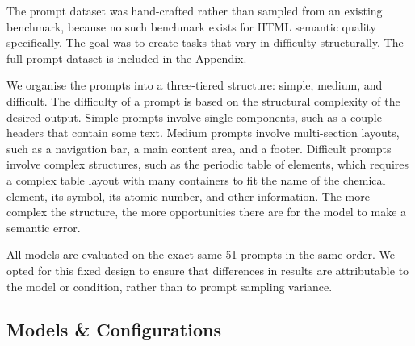 The prompt dataset was hand-crafted rather than sampled from an existing benchmark, because no such benchmark exists for HTML semantic quality specifically. The goal was to create tasks that vary in difficulty structurally. The full prompt dataset is included in the Appendix.




We organise the prompts into a three-tiered structure: simple, medium, and difficult. The difficulty of a prompt is based on the structural complexity of the desired output. Simple prompts involve single components, such as a couple headers that contain some text. Medium prompts involve multi-section layouts, such as a navigation bar, a main content area, and a footer. Difficult prompts involve complex structures, such as the periodic table of elements, which requires a complex table layout with many containers to fit the name of the chemical element, its symbol, its atomic number, and other information. The more complex the structure, the more opportunities there are for the model to make a semantic error.




All models are evaluated on the exact same 51 prompts in the same order. We opted for this fixed design to ensure that differences in results are attributable to the model or condition, rather than to prompt sampling variance.


\subsection{Models \& Configurations}
\label{subsec:models-configurations}


